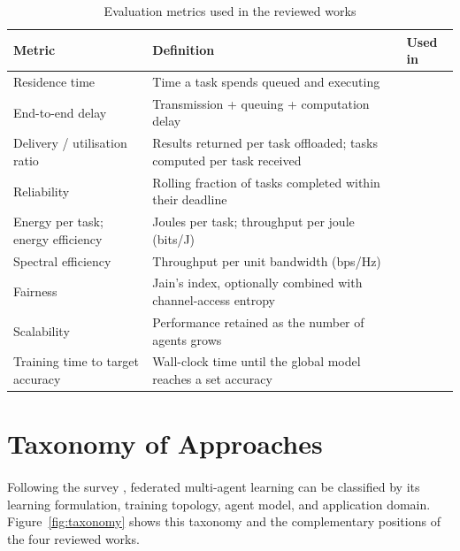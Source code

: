 \documentclass[12pt,a4paper,final]{extreport}
\begin{document}
{\renewcommand{\arraystretch}{1.15}
\begin{table}[htbp]
\centering
\caption{Evaluation metrics used in the reviewed works}\label{tab:metrics}
\small
\begin{tabularx}{\textwidth}{|p{3.4cm}|X|p{1.3cm}|}
\hline
\textbf{Metric} & \textbf{Definition} & \textbf{Used in} \\ \hline
Residence time & Time a task spends queued and executing & \cite{p1} \\ \hline
End-to-end delay & Transmission + queuing + computation delay & \cite{p1} \\ \hline
Delivery / utilisation ratio & Results returned per task offloaded; tasks computed per task received & \cite{p1} \\ \hline
Reliability & Rolling fraction of tasks completed within their deadline & \cite{p2} \\ \hline
Energy per task; energy efficiency & Joules per task; throughput per joule (bits/J) & \cite{p2} \\ \hline
Spectral efficiency & Throughput per unit bandwidth (bps/Hz) & \cite{p2} \\ \hline
Fairness & Jain's index, optionally combined with channel-access entropy & \cite{p2} \\ \hline
Scalability & Performance retained as the number of agents grows & \cite{p2,p4} \\ \hline
Training time to target accuracy & Wall-clock time until the global model reaches a set accuracy & \cite{p4} \\ \hline
\end{tabularx}
\end{table}}

\section{Taxonomy of Approaches}

\paragraph{} Following the survey \cite{p3}, federated multi-agent learning can be classified by its learning formulation, training topology, agent model, and application domain. Figure~\ref{fig:taxonomy} shows this taxonomy and the complementary positions of the four reviewed works.
\end{document}
